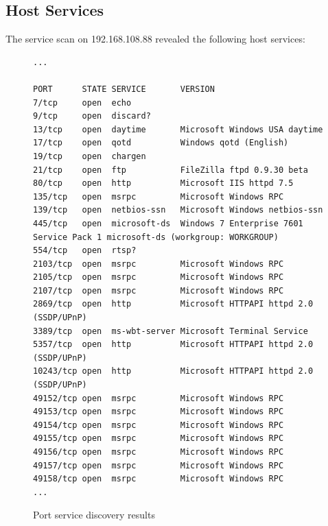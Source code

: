 \documentclass[11pt, oneside]{article}   	%
\begin{document}
\subsection{Host Services}

The service scan on 192.168.108.88 revealed the following host services:

\begin{figure}[h!!]
	\fontsize{8pt}{4pt}
	\begin{verbatim}
...

PORT      STATE SERVICE       VERSION
7/tcp     open  echo
9/tcp     open  discard?
13/tcp    open  daytime       Microsoft Windows USA daytime
17/tcp    open  qotd          Windows qotd (English)
19/tcp    open  chargen
21/tcp    open  ftp           FileZilla ftpd 0.9.30 beta
80/tcp    open  http          Microsoft IIS httpd 7.5
135/tcp   open  msrpc         Microsoft Windows RPC
139/tcp   open  netbios-ssn   Microsoft Windows netbios-ssn
445/tcp   open  microsoft-ds  Windows 7 Enterprise 7601 Service Pack 1 microsoft-ds (workgroup: WORKGROUP)
554/tcp   open  rtsp?
2103/tcp  open  msrpc         Microsoft Windows RPC
2105/tcp  open  msrpc         Microsoft Windows RPC
2107/tcp  open  msrpc         Microsoft Windows RPC
2869/tcp  open  http          Microsoft HTTPAPI httpd 2.0 (SSDP/UPnP)
3389/tcp  open  ms-wbt-server Microsoft Terminal Service
5357/tcp  open  http          Microsoft HTTPAPI httpd 2.0 (SSDP/UPnP)
10243/tcp open  http          Microsoft HTTPAPI httpd 2.0 (SSDP/UPnP)
49152/tcp open  msrpc         Microsoft Windows RPC
49153/tcp open  msrpc         Microsoft Windows RPC
49154/tcp open  msrpc         Microsoft Windows RPC
49155/tcp open  msrpc         Microsoft Windows RPC
49156/tcp open  msrpc         Microsoft Windows RPC
49157/tcp open  msrpc         Microsoft Windows RPC
49158/tcp open  msrpc         Microsoft Windows RPC
...
	\end{verbatim}
	\caption{Port service discovery results}
\end{figure}
\end{document}
